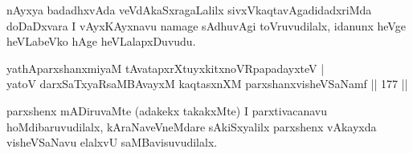 \begin{artha}
nAyxya badadhxvAda veVdAkaSxragaLalilx sivxVkaqtavAgadidadxriMda doDaDxvara I vAyxKAyxnavu namage sAdhuvAgi toVruvudilalx, idanunx heVge heVLabeVko hAge heVLalapxDuvudu.
\end{artha}


\begin{shl}
yathAparxshanxmiyaM tAvatapxrXtuyxkitxnoVRpapadayxteV |\\
yatoV darxSaTxyaRsaMBAvayxM kaqtasxnXM parxshanxvisheVSaNamf \hfill || 177 ||
\end{shl}

\begin{artha}
parxshenx mADiruvaMte (adakekx takakxMte) I parxtivacanavu hoMdibaruvudilalx, kAraNaveVneMdare sAkiSxyalilx parxshenx vAkayxda visheVSaNavu elalxvU saMBavisuvudilalx.
\end{artha}

